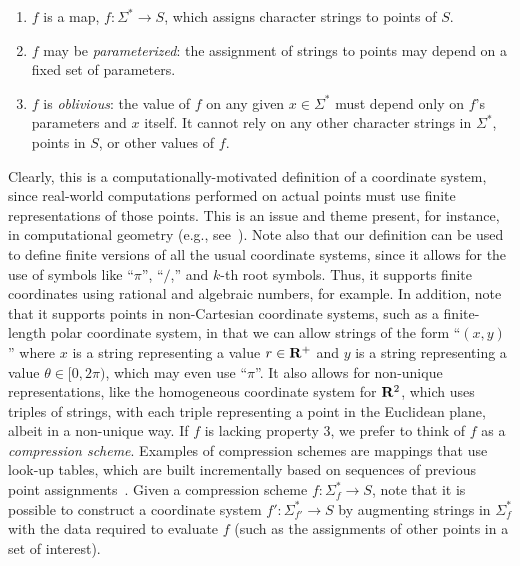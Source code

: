 \documentclass[11pt]{article}
\newcommand{\R}{{\bf R}}
\begin{document}
\begin{enumerate}
\item $f$ is a map, $f:\Sigma^* \rightarrow S$, which assigns
character strings to points of $S$.

\item $f$ may be \emph{parameterized}: 
the assignment of strings to 
points may depend on a fixed set of parameters.

\item $f$ is \emph{oblivious}:
the value of $f$ on any given $x\in \Sigma^*$ must depend
only on $f$'s parameters and $x$ itself. It cannot
rely on any other character 
strings in $\Sigma^*$, points in $S$, or other values of $f$. 
\end{enumerate}

\ifFull
Clearly, this is a computationally-motivated definition of 
a coordinate system, since real-world computations performed on 
actual points must use finite representations of those points.
This is an issue and theme
present, for instance,
in computational geometry (e.g.,
see~\cite{bcddprty-pcet-99,by-ag-98,bepp-cegpu-97,by-eeesd-00,bkmnsu-egcl-95,em-sstcd-90,fv-eeacg-93,gght-srlse-97,gm-rad-98,ils-lcpfp-05,ph-srr-01,ps-cgi-90,s-apfpa-97,ssw-ctdrt-03}).
Note also that
our definition can be used to define finite versions of 
all the usual coordinate systems, since it allows for the use of symbols
like ``$\pi$'', ``$/$,'' and $k$-th root symbols. 
Thus, it supports finite coordinates using rational and algebraic
numbers, for example.
In addition, note that it supports points in non-Cartesian coordinate
systems, such as a finite-length polar coordinate system,
in that we can allow 
strings of the form ``$(x,y)$'' where 
$x$ is a string representing a value $r\in \R^{+}$ and $y$ 
is a string representing a value $\theta\in [0,2\pi)$, which may even use
``$\pi$''. It also allows for non-unique representations, like the 
homogeneous coordinate system for $\R^2$, which uses triples
of strings, with each triple representing a point in the Euclidean 
plane, albeit in a non-unique way.
\fi
If $f$ is lacking property 3, we prefer to think of $f$ 
as a \emph{compression scheme}.
\ifFull 
Examples of compression schemes are 
mappings that use look-up tables, which are built incrementally based on 
sequences of previous point assignments~\cite{ils-lcpfp-05}.
Given a compression scheme $f:\Sigma_f^*\rightarrow S$, 
note that it is possible to
construct a coordinate system $f':\Sigma_{f'}^*\rightarrow S$ by 
augmenting strings in $\Sigma_f^*$ with the data required 
to evaluate $f$ (such as the assignments of other points in a set of
interest).
\fi
\end{document}
